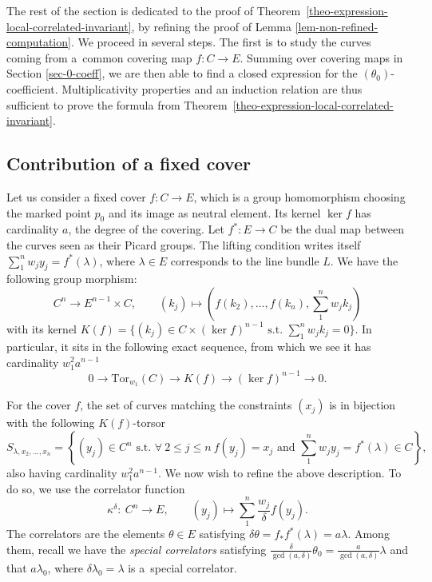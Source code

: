 \documentclass[11pt]{article}
\numberwithin{equation}{section}
\newcommand{\Tor}{\mathrm{Tor}}
\numberwithin{equation}{section}
\theoremstyle{definition}
\begin{document}
The rest of the section is dedicated to the proof of Theorem~\ref{theo-expression-local-correlated-invariant}, by refining the proof of Lemma \ref{lem-non-refined-computation}. We proceed in several steps. The first is to study the curves coming from a~common covering map $f\colon C\to E$. Summing over covering maps in Section \ref{sec-0-coeff}, we are then able to find a closed expression for the $(\theta_0)$-coefficient. Multiplicativity properties and an induction relation are thus sufficient to prove the formula from Theorem~\ref{theo-expression-local-correlated-invariant}.

 \subsection{Contribution of a fixed cover}

 Let us consider a fixed cover $f\colon C\to E$, which is a group homomorphism choosing the marked point $p_0$ and its image as neutral element. Its kernel $\ker f$ has cardinality $a$, the degree of the covering. Let $f^*\colon E\to C$ be the dual map between the curves seen as their Picard groups. The lifting condition writes itself $\sum_1^n w_jy_j=f^*(\lambda)$, where $\lambda\in E$ corresponds to the line bundle $L$. We have the following group morphism:
 \[
 C^n \longrightarrow E^{n-1}\times C, \qquad
 (k_j) \longmapsto \left(f(k_2),\dots,f(k_n),\sum_1^n w_jk_j \right)
 \]
 with its kernel $K(f)=\big\{ (k_j)\in C\times(\ker f)^{n-1} \text{ s.t. } \sum_1^n w_jk_j=0 \big\}$. In particular, it sits in the following exact sequence, from which we see it has cardinality $w_1^2 a^{n-1}$
 \[ 0\to \Tor_{w_1}(C) \to K(f) \to (\ker f)^{n-1} \to 0. \]

 For the cover $f$, the set of curves matching the constraints $(x_j)$ is in bijection with the following $K(f)$-torsor
 \[ S_{\lambda,x_2,\dots,x_n}=\left\{ (y_j)\in C^n \text{ s.t. }\forall \ 2\leqslant j\leqslant n \ f(y_j)=x_j \text{ and }\sum_1^n w_jy_j=f^*(\lambda)\in C\right\}, \]
also having cardinality $w_1^2a^{n-1}$. We now wish to refine the above description. To do so, we use the correlator function
 \[
 \kappa^\delta \colon\ C^n \longrightarrow E,\qquad
 (y_j) \longmapsto \sum_1^n \frac{w_j}{\delta}f(y_j).
 \]
 The correlators are the elements $\theta\in E$ satisfying $\delta\theta=f_*f^*(\lambda)=a\lambda$. Among them, recall we have the \textit{special correlators} satisfying $\frac{\delta}{\gcd(a,\delta)}\theta_0=\frac{a}{\gcd(a,\delta)}\lambda$ and that $a\lambda_0$, where $\delta\lambda_0=\lambda$ is a~special correlator.
\end{document}
